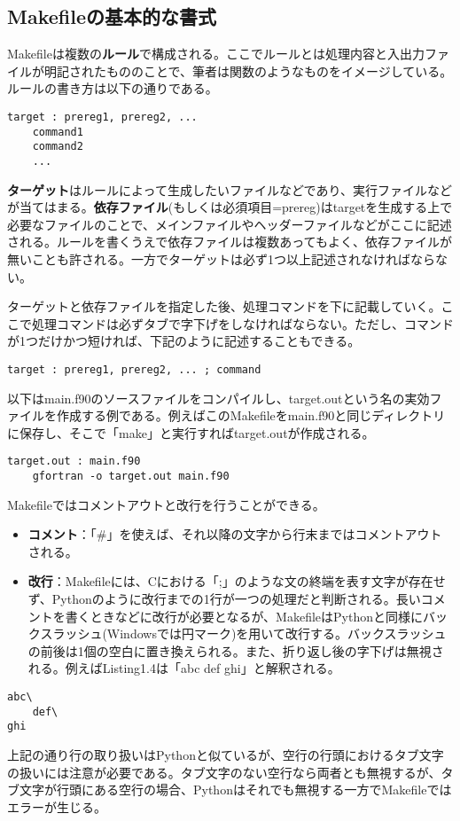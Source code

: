 \documentclass[dvipdfmx, 9pt, a4paper]{jsarticle}
\numberwithin{equation}{section}
\begin{document}
\subsection{Makefileの基本的な書式}
Makefileは複数の{\bf ルール}で構成される。ここでルールとは処理内容と入出力ファイルが明記されたもののことで、筆者は関数のようなものをイメージしている。ルールの書き方は以下の通りである。
\begin{lstlisting}[caption=Ruleの書き方]
target : prereg1, prereg2, ...
	command1
	command2
	...
\end{lstlisting}\par
{\bf ターゲット}はルールによって生成したいファイルなどであり、実行ファイルなどが当てはまる。{\bf 依存ファイル}(もしくは必須項目=prereg)はtargetを生成する上で必要なファイルのことで、メインファイルやヘッダーファイルなどがここに記述される。ルールを書くうえで依存ファイルは複数あってもよく、依存ファイルが無いことも許される。一方でターゲットは必ず1つ以上記述されなければならない。\par
ターゲットと依存ファイルを指定した後、処理コマンドを下に記載していく。ここで処理コマンドは必ずタブで字下げをしなければならない。ただし、コマンドが1つだけかつ短ければ、下記のように記述することもできる。
\begin{lstlisting}[caption=Ruleの書き方2]
target : prereg1, prereg2, ... ; command
\end{lstlisting}\par
以下はmain.f90のソースファイルをコンパイルし、target.outという名の実効ファイルを作成する例である。例えばこのMakefileをmain.f90と同じディレクトリに保存し、そこで「make」と実行すればtarget.outが作成される。
\begin{lstlisting}[caption=Makefile例]
target.out : main.f90
	gfortran -o target.out main.f90
\end{lstlisting}\par
Makefileではコメントアウトと改行を行うことができる。
\begin{itemize}
\item {\bf コメント}：「\#」を使えば、それ以降の文字から行末まではコメントアウトされる。
\item {\bf 改行}：Makefileには、Cにおける「;」のような文の終端を表す文字が存在せず、Pythonのように改行までの1行が一つの処理だと判断される。長いコメントを書くときなどに改行が必要となるが、MakefileはPythonと同様にバックスラッシュ(Windowsでは円マーク)を用いて改行する。バックスラッシュの前後は1個の空白に置き換えられる。また、折り返し後の字下げは無視される。例えばListing1.4は「abc def ghi」と解釈される。
\end{itemize}
\begin{lstlisting}[caption=Makefileにおける改行]
abc\
	def\
ghi
\end{lstlisting}\par
上記の通り行の取り扱いはPythonと似ているが、空行の行頭におけるタブ文字の扱いには注意が必要である。タブ文字のない空行なら両者とも無視するが、タブ文字が行頭にある空行の場合、Pythonはそれでも無視する一方でMakefileではエラーが生じる。
\end{document}
